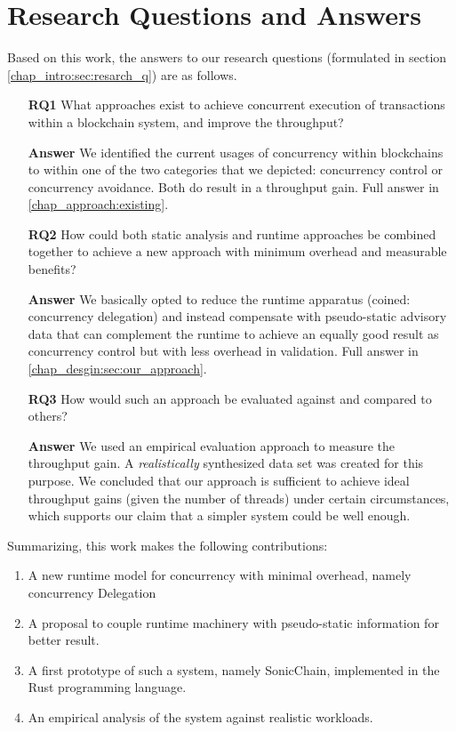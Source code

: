 \section{Research Questions and Answers} \label{chap_conc:sec:rq}

Based on this work, the answers to our research questions (formulated in section
\ref{chap_intro:sec:resarch_q}) are as follows.

\begin{enumerate}
    \item [\textbf{RQ1}] What approaches exist to achieve concurrent execution of transactions
    within a blockchain system, and improve the throughput?

    \item [\textbf{Answer}] We identified the current usages of concurrency within blockchains to
    within one of the two categories that we depicted: concurrency control or concurrency avoidance.
    Both do result in a throughput gain. Full answer in \ref{chap_approach:existing}.

    \item [\textbf{RQ2}] How could both static analysis and runtime approaches be combined together
    to achieve a new approach with minimum overhead and measurable benefits?

    \item [\textbf{Answer}] We basically opted to reduce the runtime apparatus (coined: concurrency
    delegation) and instead compensate with pseudo-static advisory data that can complement the
    runtime to achieve an equally good result as concurrency control but with less overhead in
    validation. Full answer in \ref{chap_desgin:sec:our_approach}.

    \item [\textbf{RQ3}] How would such an approach be evaluated against and compared to others?

    \item [\textbf{Answer}] We used an empirical evaluation approach to measure the throughput gain.
    A \textit{realistically} synthesized data set was created for this purpose. We concluded that
    our approach is sufficient to achieve ideal throughput gains (given the number of threads) under
    certain circumstances, which supports our claim that a simpler system could be well enough.
\end{enumerate}

Summarizing, this work makes the following contributions:
\begin{enumerate}
    \item A new runtime model for concurrency with minimal overhead, namely concurrency Delegation
    \item A proposal to couple runtime machinery with pseudo-static information for better result.
    \item A first prototype of such a system, namely SonicChain, implemented in the Rust programming
    language.
    \item An empirical analysis of the system against realistic workloads.
\end{enumerate}

